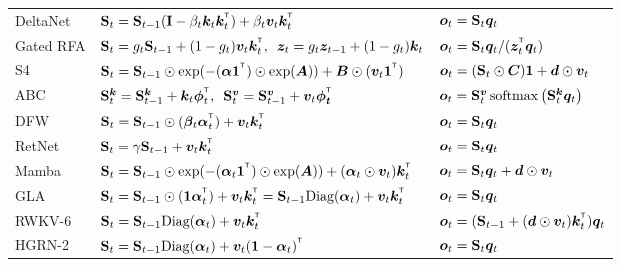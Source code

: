 \begin{table}[t!]
{\begin{tabular}{l ll}
    DeltaNet \cite{schlag_linear_2021}  & $\rmS_t =  \rmS_{t-1} (\mathbf{I} - \beta_t \vk_t \vk_t^\intercal) + \beta_t \vv_t  \vk_t^\intercal$ & ${\bm{o}}_t = {\mathbf{S}}_t {\bm{q}}_t$ \\
    Gated RFA \cite{peng_random_2021}  & $\rmS_t =  g_t \rmS_{t-1}  + (1-g_t) \vv_t  \vk_t^\intercal, \,\,\, \vz_t = g_t  \vz_{t-1} + (1-g_t)  \vk_t$ & $\vo_t = \rmS_t \vq_t / (\vz_t^\intercal\vq_t)$ \\
    S4 \cite{s4, smith_simplified_2023}  & $\rmS_t = \rmS_{t-1} \odot \exp(- (\balpha \mathbf{1}^\intercal)\odot \exp(\mA)) +   \mB \odot (\vv_t \mathbf{1}^\intercal) $ & ${\bm{o}}_t = ({\mathbf{S}}_t \odot {\bm{C}}) \mathbf{1} + {\bm{d}} \odot {\bm{v}}_t$ \\
    ABC \cite{peng_abc_2022} & $\rmS^{\vk}_t = \rmS^{\vk}_{t-1} + \vk_t\boldsymbol{\phi}_t ^\intercal, \,\,\,  \rmS^{\vv}_t = \rmS^{\vv}_{t-1} + \vv_t\boldsymbol{\phi_t} ^\intercal$  &  ${\bm{o}}_t = {\mathbf{S}}^{{\bm{v}}}_t\operatorname{softmax}\left( {\mathbf{S}}^{{\bm{k}}}_t {\bm{q}}_t\right)$
    \\
    DFW \cite{mao_fine-tuning_2022}&  $\rmS_t =  \rmS_{t-1} \odot (\bbeta_t \balpha_t^\intercal) + \vv_t  \vk_t^\intercal$ & ${\bm{o}}_t = {\mathbf{S}}_t {\bm{q}}_t$  \\    
RetNet \cite{sun2023retentive} & $\rmS_t =  \gamma\rmS_{t-1} +  \vv_t  \vk_t^\intercal$ & ${\bm{o}}_t = {\mathbf{S}}_t {\bm{q}}_t$ \\
   Mamba \cite{gu_mamba_2023} & $\rmS_t = \rmS_{t-1} \odot \exp(-(\balpha_t \mathbf{1}^\intercal)\odot \exp(\mA)) + (\balpha_t \odot \vv_t) \vk_t^\intercal $ & ${\bm{o}}_t = {\mathbf{S}}_t {\bm{q}}_t + {\bm{d}} \odot {\bm{v}}_t$  \\
    GLA \cite{yang_gated_2023}&  $\rmS_t = \rmS_{t-1}  \odot  (\mathbf{1} \balpha_t^\intercal  ) + \vv_t  \vk_t^\intercal = \rmS_{t-1}  \text{Diag}(\balpha_t  )  + \vv_t  \vk_t^\intercal$ & ${\bm{o}}_t = {\mathbf{S}}_t {\bm{q}}_t$  \\
    RWKV-6 \cite{peng_eagle_2024} &  $\rmS_t =   \rmS_{t-1} \text{Diag}(\balpha_t  ) + \vv_t  \vk_t^\intercal $ & $\vo_t = (\rmS_{t-1} + (\vd \odot  \vv_t ) \vk_t^\intercal) \vq_t$  \\ 
    HGRN-2 \cite{qin_hgrn2_2024} &  $\rmS_t =   \rmS_{t-1} \text{Diag}( \balpha_t) + \vv_t  (\mathbf{1} - \balpha_t)^\intercal $ & ${\bm{o}}_t = {\mathbf{S}}_t {\bm{q}}_t$  \\   

\end{tabular}}
\end{table}
